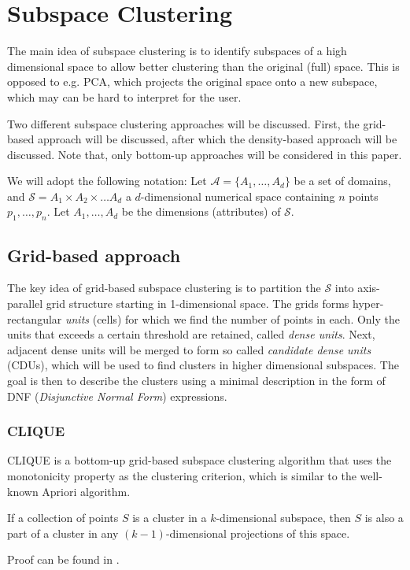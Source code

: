 \section{Subspace Clustering}
The main idea of subspace clustering is to identify subspaces of a high dimensional space to allow better clustering than the original (full) space. This is opposed to e.g. PCA, which projects the original space onto a new subspace, which may can be hard to interpret for the user.

Two different subspace clustering approaches will be discussed. First, the grid-based approach will be discussed, after which the density-based approach will be discussed. Note that, only bottom-up approaches will be considered in this paper.

We will adopt the following notation: Let $\mathcal{A} = \{A_1, \dots, A_d\}$ be a set of domains, and $\mathcal{S} = A_1 \times A_2 \times \dots A_d$ a $d$-dimensional numerical space containing $n$ points $p_1, \dots, p_n$. Let $A_1, \dots, A_d$ be the dimensions (attributes) of $\mathcal{S}$.

\subsection{Grid-based approach}
The key idea of grid-based subspace clustering is to partition the $\mathcal{S}$ into axis-parallel grid structure starting in 1-dimensional space. The grids forms hyper-rectangular \textit{units} (cells) for which we find the number of points in each. Only the units that exceeds a certain threshold are retained, called \textit{dense units}. Next, adjacent dense units will be merged to form so called \textit{candidate dense units} (CDUs), which will be used to find clusters in higher dimensional subspaces. The goal is then to describe the clusters using a minimal description in the form of DNF (\textit{Disjunctive Normal Form}) expressions.

\subsubsection{CLIQUE}
CLIQUE is a bottom-up grid-based subspace clustering algorithm that uses the monotonicity property as the clustering criterion, which is similar to the well-known Apriori algorithm.
\begin{lemma}\label{lem:mono}
    If a collection of points $S$ is a cluster in a $k$-dimensional subspace, then $S$ is also a part of a cluster in any $(k-1)$-dimensional projections of this space.
\end{lemma}
Proof can be found in \cite{clique}.

